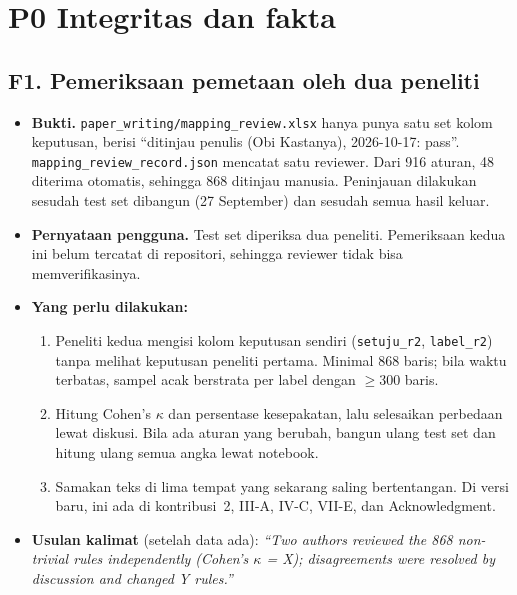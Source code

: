 \documentclass[10pt,a4paper]{article}
\newcommand{\pz}{\textcolor{red!65!black}{\textbf{P0}}}
\begin{document}
\section{\pz{} Integritas dan fakta}

\subsection*{F1. Pemeriksaan pemetaan oleh dua peneliti}
\begin{itemize}
  \item \textbf{Bukti.} \texttt{paper\_writing/mapping\_review.xlsx} hanya punya satu set kolom keputusan, berisi ``ditinjau penulis (Obi Kastanya), 2026-10-17: pass''. \texttt{mapping\_review\_record.json} mencatat satu reviewer. Dari 916 aturan, 48 diterima otomatis, sehingga 868 ditinjau manusia. Peninjauan dilakukan sesudah test set dibangun (27 September) dan sesudah semua hasil keluar.
  \item \textbf{Pernyataan pengguna.} Test set diperiksa dua peneliti. Pemeriksaan kedua ini belum tercatat di repositori, sehingga reviewer tidak bisa memverifikasinya.
  \item \textbf{Yang perlu dilakukan:}
  \begin{enumerate}
    \item Peneliti kedua mengisi kolom keputusan sendiri (\texttt{setuju\_r2}, \texttt{label\_r2}) tanpa melihat keputusan peneliti pertama. Minimal 868 baris; bila waktu terbatas, sampel acak berstrata per label dengan $\ge$300 baris.
    \item Hitung Cohen's $\kappa$ dan persentase kesepakatan, lalu selesaikan perbedaan lewat diskusi. Bila ada aturan yang berubah, bangun ulang test set dan hitung ulang semua angka lewat notebook.
    \item Samakan teks di lima tempat yang sekarang saling bertentangan. Di versi baru, ini ada di kontribusi~2, III-A, IV-C, VII-E, dan Acknowledgment.
  \end{enumerate}
  \item \textbf{Usulan kalimat} (setelah data ada): \emph{``Two authors reviewed the 868 non-trivial rules independently (Cohen's $\kappa$ = X); disagreements were resolved by discussion and changed Y rules.''}
\end{itemize}
\end{document}
